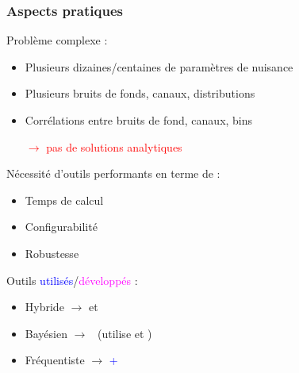 \begin{frame}
\frametitle{Aspects pratiques}
\begin{maliste}
\item Problème complexe :
\begin{itemize}
\item Plusieurs dizaines/centaines de paramètres de nuisance
\item Plusieurs bruits de fonds, canaux, distributions
\item Corrélations entre bruits de fond, canaux, bins
\vspace*{0.2cm}
\begin{center}
\textcolor{red}{$\rightarrow$ pas de solutions analytiques}
\end{center}
\end{itemize}
\vspace*{0.3cm}
\pause
\item Nécessité d'outils performants en terme de :
\begin{itemize}
\item Temps de calcul %
\item Configurabilité 
\item Robustesse
\end{itemize}
\vspace*{0.3cm}
\pause
\item Outils \textcolor{blue}{utilisés}/\textcolor{magenta}{développés} :
\begin{itemize}
\item Hybride $\rightarrow$ \textcolor{blue}{\mclimit{}} et \textcolor{magenta}{\OTH}
\item Bayésien $\rightarrow$ \textcolor{magenta}{\tifosi}~(utilise \roofit{} et \roostats)
\item Fréquentiste $\rightarrow$ \textcolor{blue}{\histfactory+\roostats}
\end{itemize}
\end{maliste}
\end{frame}

